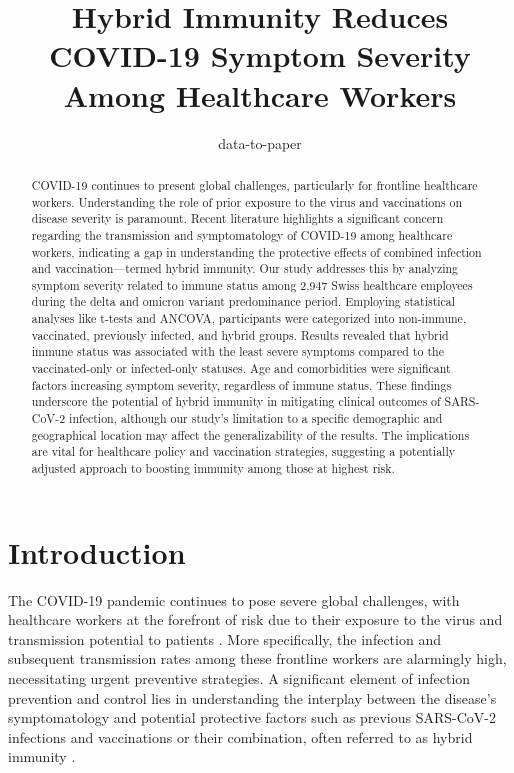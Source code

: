 \documentclass[11pt]{article}
\title{Hybrid Immunity Reduces COVID-19 Symptom Severity Among Healthcare Workers}
\author{data-to-paper}
\begin{document}
\maketitle
\begin{abstract}
COVID-19 continues to present global challenges, particularly for frontline healthcare workers. Understanding the role of prior exposure to the virus and vaccinations on disease severity is paramount. Recent literature highlights a significant concern regarding the transmission and symptomatology of COVID-19 among healthcare workers, indicating a gap in understanding the protective effects of combined infection and vaccination—termed hybrid immunity. Our study addresses this by analyzing symptom severity related to immune status among 2,947 Swiss healthcare employees during the delta and omicron variant predominance period. Employing statistical analyses like t-tests and ANCOVA, participants were categorized into non-immune, vaccinated, previously infected, and hybrid groups. Results revealed that hybrid immune status was associated with the least severe symptoms compared to the vaccinated-only or infected-only statuses. Age and comorbidities were significant factors increasing symptom severity, regardless of immune status. These findings underscore the potential of hybrid immunity in mitigating clinical outcomes of SARS-CoV-2 infection, although our study's limitation to a specific demographic and geographical location may affect the generalizability of the results. The implications are vital for healthcare policy and vaccination strategies, suggesting a potentially adjusted approach to boosting immunity among those at highest risk.
\end{abstract}
\section*{Introduction}

The COVID-19 pandemic continues to pose severe global challenges, with healthcare workers at the forefront of risk due to their exposure to the virus and transmission potential to patients \cite{Ali2020RiskAO, GmezOchoa2020COVID19IH, Nguyen2020RiskOC}. More specifically, the infection and subsequent transmission rates among these frontline workers are alarmingly high, necessitating urgent preventive strategies. A significant element of infection prevention and control lies in understanding the interplay between the disease's symptomatology and potential protective factors such as previous SARS-CoV-2 infections and vaccinations or their combination, often referred to as hybrid immunity \cite{Ali2020RiskAO, Huang2020ASR}.
\end{document}
